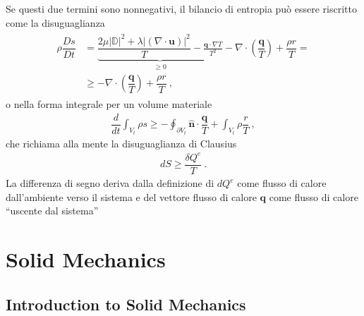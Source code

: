 \documentclass[letterpaper,10pt,english]{jupyterBook}
\begin{document}
\begin{itemize}
\sphinxAtStartPar
Se questi due termini sono non\sphinxhyphen{}negativi, il bilancio di entropia può essere riscritto come la disuguaglianza
\begin{equation*}
\begin{split}\begin{aligned}
    \rho \dfrac{D s}{D t}
    & = \underbrace{\dfrac{2 \mu |\mathbb{D}|^2 + \lambda |(\nabla \cdot \mathbf{u})|^2 }{T} - \frac{\mathbf{q} \cdot \nabla T}{T^2}}_{\ge 0} - \nabla \cdot \left( \dfrac{\mathbf{q}}{T} \right) + \dfrac{\rho r}{T} = \\
    & \ge  - \nabla \cdot \left( \dfrac{\mathbf{q}}{T} \right) + \dfrac{\rho r}{T} \ ,
  \end{aligned}\end{split}
\end{equation*}
\sphinxAtStartPar
o nella forma integrale per un volume materiale
\begin{equation*}
\begin{split}\dfrac{d}{dt} \int_{V_t} \rho s \ge - \oint_{\partial V_t} \mathbf{\hat{n}} \cdot \dfrac{\mathbf{q}}{T} + \int_{V_t} \rho \dfrac{r}{T} \ ,\end{split}
\end{equation*}
\sphinxAtStartPar
che richiama alla mente la disuguaglianza di Clausius  
\begin{equation*}
\begin{split}d S \ge \dfrac{\delta Q^{e}}{T} \ .\end{split}
\end{equation*}
\sphinxAtStartPar
La differenza di segno deriva dalla definizione di \(d Q^e\) come flusso di calore dall’ambiente verso il sistema e del vettore flusso di calore \(\mathbf{q}\) come flusso di calore “uscente dal sistema” 

\end{itemize}

\sphinxstepscope


\part{Solid Mechanics}

\sphinxstepscope


\chapter{Introduction to Solid Mechanics}
\label{\detokenize{ch/solids/intro:introduction-to-solid-mechanics}}\label{\detokenize{ch/solids/intro:solid-mechanics-intro}}\label{\detokenize{ch/solids/intro::doc}}
\sphinxstepscope
\end{document}
